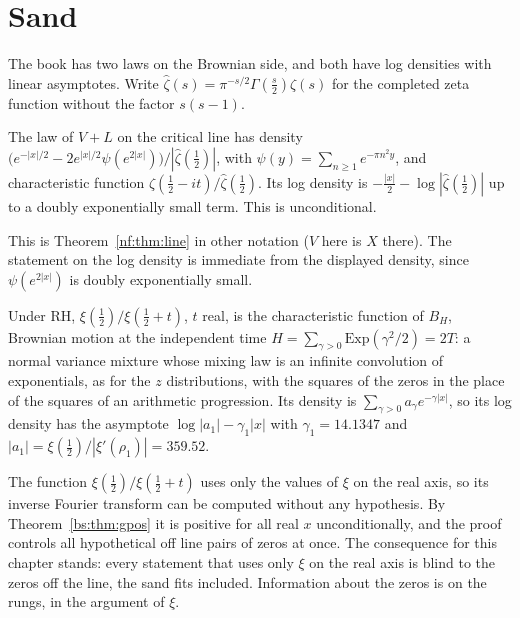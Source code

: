 \section{Sand}\label{bn:sec:sand}
The book has two laws on the Brownian side, and both have log densities with linear asymptotes. Write $\widehat\zeta(s)=\pi^{-s/2}\Gamma(\frac s2)\zeta(s)$ for the completed zeta function without the factor $s(s-1)$.
\begin{proposition}\label{bn:prop:half}
The law of $V+L$ on the critical line has density $\bigl(e^{-|x|/2}-2e^{|x|/2}\psi(e^{2|x|})\bigr)/|\widehat\zeta(\frac12)|$, with $\psi(y)=\sum_{n\ge1}e^{-\pi n^2y}$, and characteristic function $\widehat\zeta(\frac12-it)/\widehat\zeta(\frac12)$. Its log density is $-\frac{|x|}2-\log|\widehat\zeta(\frac12)|$ up to a doubly exponentially small term. This is unconditional.
\end{proposition}
\noindent This is Theorem~\ref{nf:thm:line} in other notation ($V$ here is $X$ there). The statement on the log density is immediate from the displayed density, since $\psi(e^{2|x|})$ is doubly exponentially small.
\begin{proposition}\label{bn:prop:slope}
Under RH, $\xi(\frac12)/\xi(\frac12+t)$, $t$ real, is the characteristic function of $B_H$, Brownian motion at the independent time $H=\sum_{\gamma>0}\mathrm{Exp}(\gamma^2/2)=2T$: a normal variance mixture whose mixing law is an infinite convolution of exponentials, as for the $z$ distributions, with the squares of the zeros in the place of the squares of an arithmetic progression. Its density is $\sum_{\gamma>0}a_\gamma e^{-\gamma|x|}$, so its log density has the asymptote $\log|a_1|-\gamma_1|x|$ with $\gamma_1=14.1347$ and $|a_1|=\xi(\frac12)/|\xi'(\rho_1)|=359.52$.
\end{proposition}
\noindent The function $\xi(\frac12)/\xi(\frac12+t)$ uses only the values of $\xi$ on the real axis, so its inverse Fourier transform can be computed without any hypothesis. By Theorem~\ref{bs:thm:gpos} it is positive for all real $x$ unconditionally, and the proof controls all hypothetical off line pairs of zeros at once. The consequence for this chapter stands: every statement that uses only $\xi$ on the real axis is blind to the zeros off the line, the sand fits included. Information about the zeros is on the rungs, in the argument of $\xi$.

